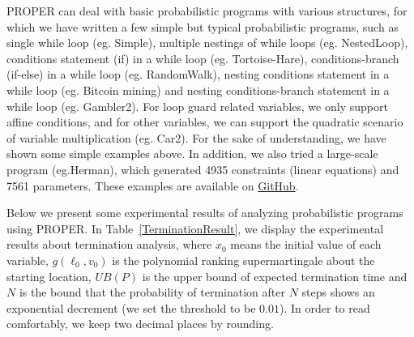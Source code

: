 \documentclass[conference]{IEEEtran}
\begin{document}
PROPER can deal with basic probabilistic programs with various structures, for which we have written a few simple but typical probabilistic programs, such as single while loop (eg. Simple), multiple nestings of while loops (eg. NestedLoop), conditions statement (if) in a while loop (eg. Tortoise-Hare), conditions-branch (if-else) in a while loop (eg. RandomWalk), nesting conditions statement in a while loop (eg. Bitcoin mining) and nesting conditions-branch statement in a while loop (eg. Gambler2). For loop guard related variables, we only support affine conditions, and for other variables, we can support the quadratic scenario of variable multiplication (eg. Car2). For the sake of understanding, we have shown some simple examples above. In addition, we also tried a large-scale program (eg.Herman), which generated 4935 constraints (linear equations) and 7561 parameters. These examples are available on \href{https://github.com/Healing1219/PROPER}{GitHub}.

Below we present some experimental results of analyzing probabilistic programs using PROPER. In Table~\ref{TerminationResult}, we display the experimental results about termination analysis, where $x_0$ means the initial value of each variable, $g(\ell_0,v_0)$ is the polynomial ranking supermartingale about the starting location, $UB(P)$ is the upper bound of expected termination time and $N$ is the bound that the probability of termination after $N$ steps shows an exponential decrement (we set the threshold to  be $0.01$). In order to read comfortably, we keep two decimal places by rounding.
\end{document}
